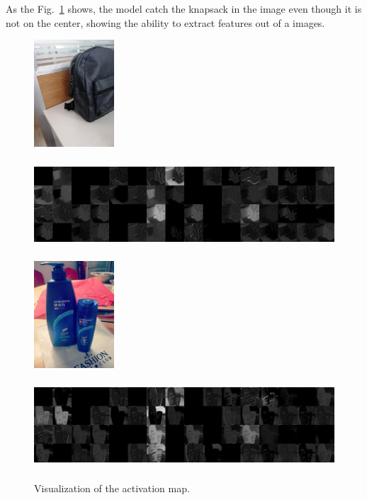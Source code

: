 As the Fig.~\ref{fig:actmap} shows, the model catch the knapsack in the image even though it is not on the center, showing the ability to
extract features out of a images.

\begin{figure}[ht]
  \begin{minipage}[b]{\linewidth}
    \centering
    \includegraphics[height=4cm]{figs/img_7224.jpg}
  \end{minipage}
  \begin{minipage}[b]{\linewidth}
    \centering
    \includegraphics[height=4cm]{figs/ReLU_2.jpg}
    \vspace{2mm}
  \end{minipage}
  \begin{minipage}{\linewidth}
    \centering
    \includegraphics[height=4cm]{figs/img_12875.jpg}
  \end{minipage}
  \begin{minipage}[b]{\linewidth}
    \centering
    \includegraphics[height=4cm]{figs/12875_ReLU_2.jpg}
  \end{minipage}
  \caption{Visualization of the activation map.}
  \label{fig:actmap}
\end{figure}
